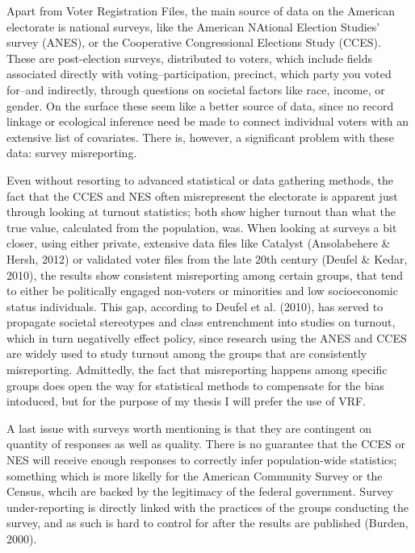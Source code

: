 \documentclass[12pt,twoside]{reedthesis}
\begin{document}
  Apart from Voter Registration Files, the main source of data on the
  American electorate is national surveys, like the American NAtional
  Election Studies' survey (ANES), or the Cooperative Congressional
  Elections Study (CCES). These are post-election surveys, distributed to
  voters, which include fields associated directly with
  voting--participation, precinct, which party you voted for--and
  indirectly, through questions on societal factors like race, income, or
  gender. On the surface these seem like a better source of data, since no
  record linkage or ecological inference need be made to connect
  individual voters with an extensive list of covariates. There is,
  however, a significant problem with these data: survey misreporting.
  
  Even without resorting to advanced statistical or data gathering
  methods, the fact that the CCES and NES often misrepresent the
  electorate is apparent just through looking at turnout statistics; both
  show higher turnout than what the true value, calculated from the
  population, was. When looking at surveys a bit closer, using either
  private, extensive data files like Catalyst (Ansolabehere \& Hersh,
  2012) or validated voter files from the late 20th century (Deufel \&
  Kedar, 2010), the results show consistent misreporting among certain
  groups, that tend to either be politically engaged non-voters or
  minorities and low socioeconomic status individuals. This gap, according
  to Deufel et al. (2010), has served to propagate societal stereotypes
  and class entrenchment into studies on turnout, which in turn
  negativelly effect policy, since research using the ANES and CCES are
  widely used to study turnout among the groups that are consistently
  misreporting. Admittedly, the fact that misreporting happens among
  specific groups does open the way for statistical methods to compensate
  for the bias intoduced, but for the purpose of my thesis I will prefer
  the use of VRF.
  
  A last issue with surveys worth mentioning is that they are contingent
  on quantity of responses as well as quality. There is no guarantee that
  the CCES or NES will receive enough responses to correctly infer
  population-wide statistics; something which is more likelly for the
  American Community Survey or the Census, whcih are backed by the
  legitimacy of the federal government. Survey under-reporting is directly
  linked with the practices of the groups conducting the survey, and as
  such is hard to control for after the results are published (Burden,
  2000).
  
\end{document}
